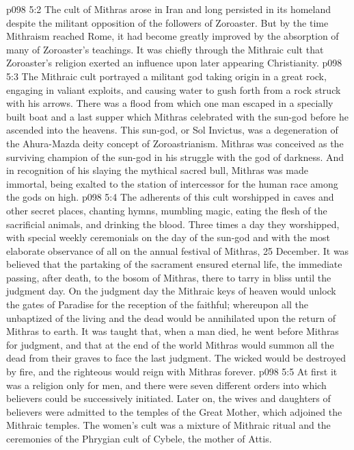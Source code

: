 \vs p098 5:2 The cult of Mithras arose in Iran and long persisted in its homeland despite the militant opposition of the followers of Zoroaster. But by the time Mithraism reached Rome, it had become greatly improved by the absorption of many of Zoroaster’s teachings. It was chiefly through the Mithraic cult that Zoroaster’s religion exerted an influence upon later appearing Christianity.
\vs p098 5:3 \pc The Mithraic cult portrayed a militant god taking origin in a great rock, engaging in valiant exploits, and causing water to gush forth from a rock struck with his arrows. There was a flood from which one man escaped in a specially built boat and a last supper which Mithras celebrated with the sun\hyp{}god before he ascended into the heavens. This sun\hyp{}god, or Sol Invictus, was a degeneration of the Ahura\hyp{}Mazda deity concept of Zoroastrianism. Mithras was conceived as the surviving champion of the sun\hyp{}god in his struggle with the god of darkness. And in recognition of his slaying the mythical sacred bull, Mithras was made immortal, being exalted to the station of intercessor for the human race among the gods on high.
\vs p098 5:4 The adherents of this cult worshipped in caves and other secret places, chanting hymns, mumbling magic, eating the flesh of the sacrificial animals, and drinking the blood. Three times a day they worshipped, with special weekly ceremonials on the day of the sun\hyp{}god and with the most elaborate observance of all on the annual festival of Mithras, 25 December. It was believed that the partaking of the sacrament ensured eternal life, the immediate passing, after death, to the bosom of Mithras, there to tarry in bliss until the judgment day. On the judgment day the Mithraic keys of heaven would unlock the gates of Paradise for the reception of the faithful; whereupon all the unbaptized of the living and the dead would be annihilated upon the return of Mithras to earth. It was taught that, when a man died, he went before Mithras for judgment, and that at the end of the world Mithras would summon all the dead from their graves to face the last judgment. The wicked would be destroyed by fire, and the righteous would reign with Mithras forever.
\vs p098 5:5 At first it was a religion only for men, and there were seven different orders into which believers could be successively initiated. Later on, the wives and daughters of believers were admitted to the temples of the Great Mother, which adjoined the Mithraic temples. The women’s cult was a mixture of Mithraic ritual and the ceremonies of the Phrygian cult of Cybele, the mother of Attis.
